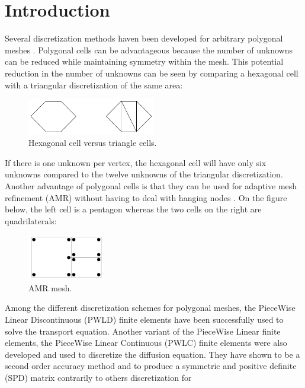 \section{Introduction}
Several discretization methods haven been developed for arbitrary polygonal
meshes \cite{pwld_2d,pwld_3d,pwl_diffusion,palmer_ane,palmer_proc,palmer_fe,
wachspress,cell_centered_diff,mimetic}. Polygonal cells can be advantageous 
because the number of unknowns can be reduced while maintaining symmetry 
within the mesh. This potential reduction in the number of unknowns can be 
seen by comparing a hexagonal cell with a triangular discretization of the 
same area:
\begin{figure}[H]
\centering
\includegraphics[width=0.5\textwidth]{hex_tri_cells}
\caption{Hexagonal cell versus triangle cells.}
\end{figure}
If there is one unknown per vertex, the hexagonal cell will have only six
unknowns compared to the twelve unknowns of the triangular discretization. 
Another advantage of polygonal cells is that they can be used for adaptive 
mesh refinement (AMR) \cite{amr_rad,amr_block,amr_unstruc} without having to
deal with hanging nodes \cite{arbitrary_hanging_nodes,dealII_hanging_nodes,
locally_hanging_nodes}. On the figure below, the left cell is a pentagon whereas 
the two cells on the right are quadrilaterals:
\begin{figure}[H]
\centering
\includegraphics[width=0.3\textwidth]{amr}
\caption{AMR mesh.}
\end{figure}
Among the different discretization schemes for polygonal meshes, the PieceWise 
Linear Discontinuous (PWLD) finite elements \cite{pwld_2d,pwld_3d} have been 
successfully used to solve the transport equation. Another variant of the
PieceWise Linear finite elements, the PieceWise Linear Continuous (PWLC) finite 
elements were also developed and used to discretize the diffusion equation. 
They have shown to be a second order accuracy method and to produce a symmetric 
and positive definite (SPD) matrix contrarily to others discretization for 

